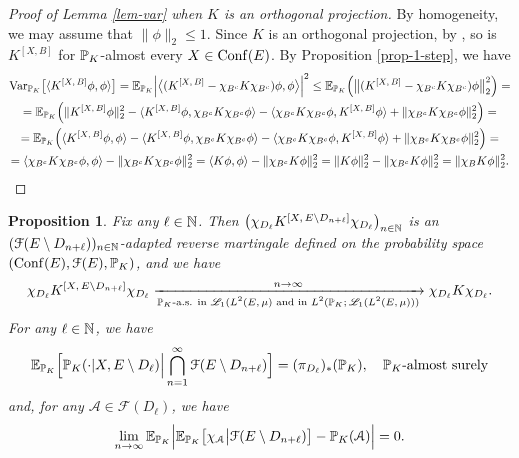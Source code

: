 \documentclass[12pt]{paper}
\newtheorem{proposition}[theorem]{Proposition}
\numberwithin{theorem}{section}
\numberwithin{figure}{section}
\numberwithin{equation}{section}
\begin{document}
\begin{proof}[Proof of Lemma \ref{lem-var} when $K$ is an orthogonal projection]
By homogeneity, we may assume that
$
\| \phi\|_2 \le 1.
$
Since $K$ is an orthogonal projection, by \cite[Proposition 2.4]{BQS}, so is $K^{[X, B]}$ for $\mathbb{P}_K$-almost every $X\in \mathrm{Conf}(E)$. By Proposition \ref{prop-1-step}, we have
\begin{multline}
\mathrm{Var}_{\mathbb{P}_K} \big[\langle K^{[X, \, B]} \phi, \phi \rangle \big] = \mathbb{E}_{\mathbb{P}_K}\Big |  \big\langle (K^{[X, \, B]}  - \chi_{B^c} K \chi_{B^c}) \phi, \phi  \big\rangle \Big|^2  \le \mathbb{E}_{\mathbb{P}_K} \Big(\big \|  (K^{[X, \, B]}  - \chi_{B^c} K \chi_{B^c}) \phi \big\|_2^2   \Big)=
\\
= \mathbb{E}_{\mathbb{P}_K}\Big  ( \|   K^{[X, \, B]}  \phi\|_2^2   -  \langle K^{[X, \, B]}  \phi, \chi_{B^c} K \chi_{B^c} \phi \rangle - \langle \chi_{B^c} K \chi_{B^c} \phi, K^{[X, \, B]}  \phi\rangle + \|  \chi_{B^c} K \chi_{B^c} \phi \|_2^2  \Big)=
\\
 =   \mathbb{E}_{\mathbb{P}_K}\Big  (  \langle K^{[X, \, B]}  \phi, \phi \rangle  -  \langle K^{[X, \, B]}  \phi, \chi_{B^c} K \chi_{B^c} \phi \rangle - \langle \chi_{B^c} K \chi_{B^c} \phi, K^{[X, \, B]}  \phi\rangle + \|  \chi_{B^c} K \chi_{B^c} \phi \|_2^2  \Big)=
\\
 = \langle  \chi_{B^c} K \chi_{B^c} \phi, \phi\rangle -  \|  \chi_{B^c} K \chi_{B^c} \phi \|_2^2 =  \langle K\phi, \phi\rangle  - \| \chi_{B^c} K\phi\|_2^2
 = \| K\phi\|_2^2 - \| \chi_{B^c} K\phi\|_2^2  = \| \chi_B K \phi\|_2^2.
\end{multline}
\end{proof}



\begin{proposition}\label{prop-tail-re-mart}
 Fix any $\ell \in\mathbb{N}$. Then $\big(\chi_{D_\ell}K^{[X, \,  E \setminus D_{n+\ell}]} \chi_{D_\ell}\big)_{n\in\mathbb{N}}$ is an $(\mathcal{F}(E\setminus D_{n+\ell}))_{n\in\mathbb{N}}$-adapted reverse martingale defined on the probability space $(\mathrm{Conf}(E), \mathcal{F}(E), \mathbb{P}_K)$, and we have
\begin{align}\label{to-K}
 \chi_{D_\ell}K^{[X, \,  E \setminus D_{n+\ell}]} \chi_{D_\ell} \xrightarrow[\text{$\mathbb{P}_K$-a.s. in $\mathscr{L}_1(L^2(E, \mu)$ and in $L^2(\mathbb{P}_K; \mathscr{L}_1(L^2(E, \mu)))$}]{n\to\infty} \chi_{D_\ell} K \chi_{D_\ell}.
\end{align}
For any $\ell \in \mathbb{N}$, we have
\begin{align}\label{tail-marginal}
 \mathbb{E}_{\mathbb{P}_K}\Big[ \mathbb{P}_K(\cdot | X, E\setminus D_\ell) \Big|   \bigcap_{n=1}^\infty \mathcal{F}(E\setminus D_{n+\ell})\Big]  = (\pi_{D_\ell})_{*}(\mathbb{P}_K), \quad \text{$\mathbb{P}_K$-almost surely}
\end{align}
and, for any $\mathcal{A} \in \mathcal{F}(D_\ell)$, we have
\begin{align}\label{mart-event}
\lim_{n\to\infty} \mathbb{E}_{\mathbb{P}_K} \Big| \mathbb{E}_{\mathbb{P}_K}\big[\chi_{\mathcal{A}}   \big|\mathcal{F}(E\setminus D_{n+\ell}) \big]  - \mathbb{P}_{K} (\mathcal{A})  \Big| = 0.
\end{align}
\end{proposition}
\end{document}
